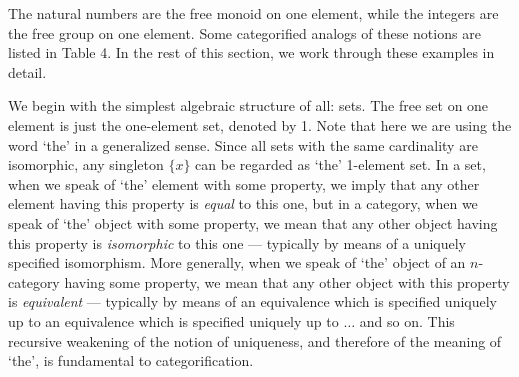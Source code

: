 The natural numbers are the free monoid on one element, while the
integers are the free group on one element.  Some categorified analogs
of these notions are listed in Table 4.   In the rest of this section,
we work through these examples in detail.  

We begin with the simplest algebraic structure of all: sets.   The free
set on one element is just the one-element set, denoted by 1.  Note that
here we are using the word `the' in a generalized sense.  Since all sets
with the same cardinality are isomorphic, any singleton $\{x\}$ can be
regarded as `the' 1-element set.    In a set, when we speak of `the'
element with some property, we imply that any other element having this
property is {\it equal} to this one, but in a category, when we speak of
`the' object with some property, we mean that any other object having
this property is {\it isomorphic} to this one --- typically by means of
a uniquely specified isomorphism.  More generally, when we speak of
`the' object of an $n$-category having some property, we mean that any
other object with this property is {\it equivalent} --- typically by
means of an equivalence which is specified uniquely up to an 
equivalence which is specified uniquely up to $\dots$ and so on.  This
recursive weakening of the notion of uniqueness, and therefore of the
meaning of `the', is fundamental to categorification.  

